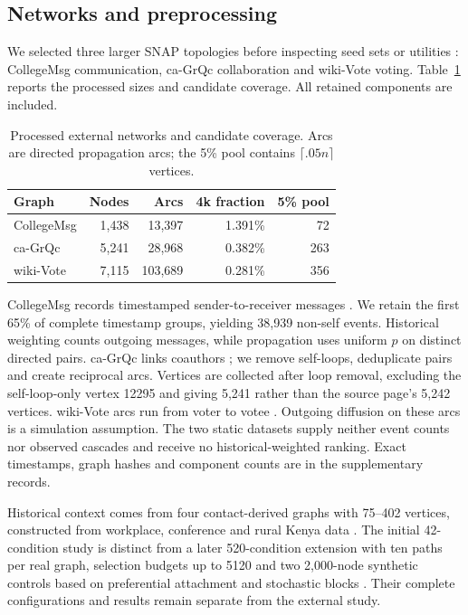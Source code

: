 \documentclass[smallextended]{svjour3}
\begin{document}
\subsection{Networks and preprocessing}
We selected three larger SNAP topologies before inspecting seed sets or utilities \cite{snap}: CollegeMsg communication, ca-GrQc collaboration and wiki-Vote voting. Table~\ref{tab:data} reports the processed sizes and candidate coverage. All retained components are included.
\begin{table}[htbp]
\caption{Processed external networks and candidate coverage. Arcs are directed propagation arcs; the 5\% pool contains $\lceil .05n\rceil$ vertices.}\label{tab:data}
\begin{tabular}{lrrrr}
\toprule
Graph & Nodes & Arcs & 4k fraction & 5\% pool \\
\midrule
CollegeMsg & 1,438 & 13,397 & 1.391\% & 72 \\
ca-GrQc & 5,241 & 28,968 & 0.382\% & 263 \\
wiki-Vote & 7,115 & 103,689 & 0.281\% & 356 \\
\bottomrule
\end{tabular}
\end{table}

CollegeMsg records timestamped sender-to-receiver messages \cite{college}. We retain the first 65\% of complete timestamp groups, yielding 38,939 non-self events. Historical weighting counts outgoing messages, while propagation uses uniform $p$ on distinct directed pairs. ca-GrQc links coauthors \cite{grqc}; we remove self-loops, deduplicate pairs and create reciprocal arcs. Vertices are collected after loop removal, excluding the self-loop-only vertex 12295 and giving 5,241 rather than the source page's 5,242 vertices. wiki-Vote arcs run from voter to votee \cite{signed,links}. Outgoing diffusion on these arcs is a simulation assumption. The two static datasets supply neither event counts nor observed cascades and receive no historical-weighted ranking. Exact timestamps, graph hashes and component counts are in the supplementary records.

Historical context comes from four contact-derived graphs with 75--402 vertices, constructed from workplace, conference and rural Kenya data \cite{ref3,ref4,ref5,ref6}. The initial 42-condition study is distinct from a later 520-condition extension with ten paths per real graph, selection budgets up to 5120 and two 2,000-node synthetic controls based on preferential attachment and stochastic blocks \cite{ref17,ref18}. Their complete configurations and results remain separate from the external study.
\end{document}
